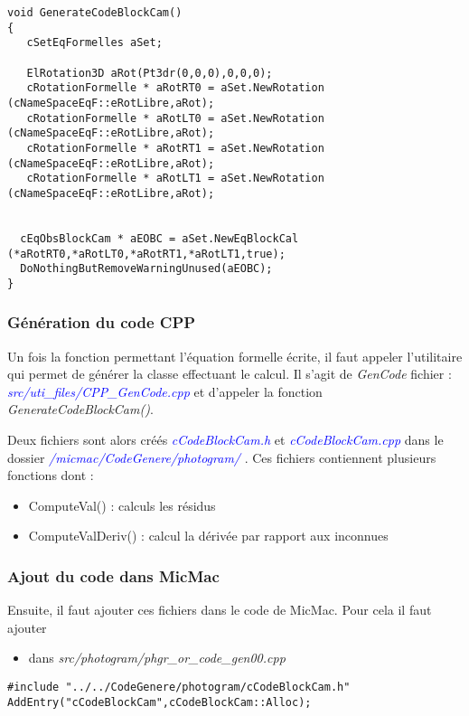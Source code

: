 \documentclass{article}
\newcommand\file[1]{
\textit{\textcolor{blue}{#1}}
}
\begin{document}
\begin{verbatim}
void GenerateCodeBlockCam()
{
   cSetEqFormelles aSet;

   ElRotation3D aRot(Pt3dr(0,0,0),0,0,0);
   cRotationFormelle * aRotRT0 = aSet.NewRotation (cNameSpaceEqF::eRotLibre,aRot);
   cRotationFormelle * aRotLT0 = aSet.NewRotation (cNameSpaceEqF::eRotLibre,aRot);
   cRotationFormelle * aRotRT1 = aSet.NewRotation (cNameSpaceEqF::eRotLibre,aRot);
   cRotationFormelle * aRotLT1 = aSet.NewRotation (cNameSpaceEqF::eRotLibre,aRot);


  cEqObsBlockCam * aEOBC = aSet.NewEqBlockCal (*aRotRT0,*aRotLT0,*aRotRT1,*aRotLT1,true);
  DoNothingButRemoveWarningUnused(aEOBC);
}

\end{verbatim}


\subsubsection{Génération du code CPP}
Un fois la fonction permettant l'équation formelle écrite, il faut appeler l'utilitaire qui permet de générer la classe effectuant le calcul.
Il s'agit de \emph{GenCode} fichier : \file{src/uti\_files/CPP\_GenCode.cpp} et d'appeler la fonction \emph{GenerateCodeBlockCam()}.

Deux fichiers sont alors créés \file{cCodeBlockCam.h} et  \file{cCodeBlockCam.cpp} dans le dossier \file{/micmac/CodeGenere/photogram/} .
Ces fichiers contiennent plusieurs fonctions dont :

\begin{itemize}
\item ComputeVal() : calculs les résidus
\item ComputeValDeriv() : calcul la dérivée par rapport aux inconnues
\end{itemize}

\subsubsection{Ajout du code dans MicMac}

Ensuite, il faut ajouter ces fichiers dans le code de MicMac.
Pour cela il faut ajouter
\begin{itemize}
\item dans \emph{src/photogram/phgr\_or\_code\_gen00.cpp} 
\end{itemize}
\begin{verbatim}
#include "../../CodeGenere/photogram/cCodeBlockCam.h"
AddEntry("cCodeBlockCam",cCodeBlockCam::Alloc);
\end{verbatim}
\end{document}
